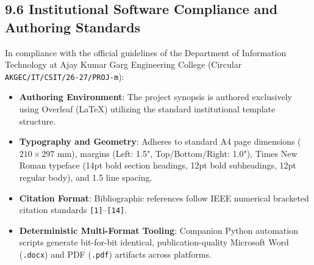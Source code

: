 \documentclass[12pt,a4paper]{article}
\begin{document}
\subsection*{9.6 Institutional Software Compliance and Authoring Standards}
In compliance with the official guidelines of the Department of Information Technology at Ajay Kumar Garg Engineering College (Circular \texttt{AKGEC/IT/CSIT/26-27/PROJ-m}):
\begin{itemize}
    \item \textbf{Authoring Environment}: The project synopsis is authored exclusively using Overleaf (LaTeX) utilizing the standard institutional template structure.
    \item \textbf{Typography and Geometry}: Adheres to standard A4 page dimensions ($210 \times 297\text{ mm}$), margins (Left: 1.5", Top/Bottom/Right: 1.0"), Times New Roman typeface (14pt bold section headings, 12pt bold subheadings, 12pt regular body), and 1.5 line spacing.
    \item \textbf{Citation Format}: Bibliographic references follow IEEE numerical bracketed citation standards \texttt{[1]}--\texttt{[14]}.
    \item \textbf{Deterministic Multi-Format Tooling}: Companion Python automation scripts generate bit-for-bit identical, publication-quality Microsoft Word (\texttt{.docx}) and PDF (\texttt{.pdf}) artifacts across platforms.
\end{itemize}
\end{document}
